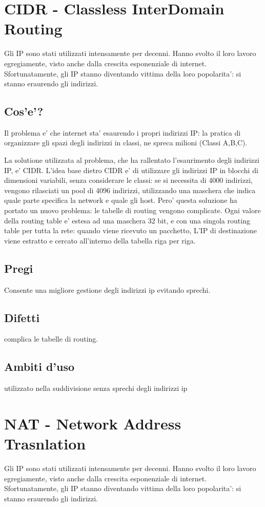 \section{CIDR - Classless InterDomain Routing}
Gli IP sono stati utilizzati intensamente per decenni. Hanno svolto il loro lavoro egregiamente, visto anche dalla crescita esponenziale di internet. Sfortunatamente, gli IP stanno diventando vittima della loro popolarita': si stanno eraurendo gli indirizzi.
\subsection{Cos'e'?}
Il problema e' che internet sta' esaurendo i propri indirizzi IP: la pratica di organizzare gli spazi degli indirizzi in classi, ne spreca milioni (Classi A,B,C). 

La solutione utilizzata al problema, che ha rallentato l'esaurimento degli indirizzi IP, e' CIDR. L'idea base dietro CIDR e' di utilizzare gli indirizzi IP in blocchi di dimensioni variabili, senza considerare le classi: se si necessita di 4000 indirizzi, vengono rilasciati un pool di 4096 indirizzi, utilizzando una maschera che indica quale parte specifica la network e quale gli host. Pero' questa soluzione ha portato un nuovo problema: le tabelle di routing vengono complicate. Ogni valore della routing table e' estesa ad una maschera 32 bit, e con una singola routing table per tutta la rete: quando viene ricevuto un pacchetto, L'IP di destinazione viene estratto e cercato all'interno della tabella riga per riga.
\subsection{Pregi}
Consente una migliore gestione degli indirizzi ip evitando sprechi.
\subsection{Difetti}
complica le tabelle di routing.
\subsection{Ambiti d'uso}
utilizzato nella suddivisione senza sprechi degli indirizzi ip
\section{NAT - Network Address Trasnlation}
Gli IP sono stati utilizzati intensamente per decenni. Hanno svolto il loro lavoro egregiamente, visto anche dalla crescita esponenziale di internet. Sfortunatamente, gli IP stanno diventando vittima della loro popolarita': si stanno eraurendo gli indirizzi.
